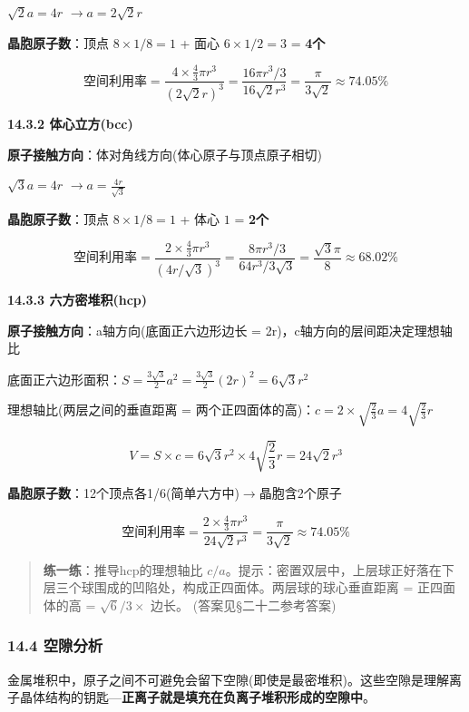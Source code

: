 \documentclass[a4paper,11pt]{ctexart}
\newcommand{\箭}{\ensuremath{\rightarrow}}
\newcommand{\左箭}{\ensuremath{\leftarrow}}
\newcommand{\上箭}{\ensuremath{\uparrow}}
\newcommand{\下箭}{\ensuremath{\downarrow}}
\newcommand{\衡}{\ensuremath{\rightleftharpoons}}
\newcommand{\双箭}{\ensuremath{\leftrightarrow}}
\newcommand{\约等于}{\ensuremath{\approx}}
\newcommand{\小于等于}{\ensuremath{\leq}}
\newcommand{\大于等于}{\ensuremath{\geq}}
\newcommand{\不等于}{\ensuremath{\neq}}
\newcommand{\西格马}{\ensuremath{\sigma}}
\newcommand{\派}{\ensuremath{\pi}}
\begin{document}
\(\sqrt{2}a = 4r\) \箭 \(a = 2\sqrt{2}r\)

\textbf{晶胞原子数}：顶点 \(8 \times 1/8 = 1\) + 面心 \(6 \times 1/2 = 3\) = \textbf{4个}

\[
\text{空间利用率} = \frac{4 \times \frac{4}{3}\pi r^3}{(2\sqrt{2}r)^3} = \frac{16\pi r^3 / 3}{16\sqrt{2}r^3} = \frac{\pi}{3\sqrt{2}} \approx 74.05\%
\]

\textbf{14.3.2 体心立方(bcc)}

\textbf{原子接触方向}：体对角线方向(体心原子与顶点原子相切)

\(\sqrt{3}a = 4r\) \箭 \(a = \frac{4r}{\sqrt{3}}\)

\textbf{晶胞原子数}：顶点 \(8 \times 1/8 = 1\) + 体心 \(1\) = \textbf{2个}

\[
\text{空间利用率} = \frac{2 \times \frac{4}{3}\pi r^3}{(4r/\sqrt{3})^3} = \frac{8\pi r^3 / 3}{64r^3 / 3\sqrt{3}} = \frac{\sqrt{3}\pi}{8} \approx 68.02\%
\]

\textbf{14.3.3 六方密堆积(hcp)}

\textbf{原子接触方向}：a轴方向(底面正六边形边长 = 2r)，c轴方向的层间距决定理想轴比

底面正六边形面积：\(S = \frac{3\sqrt{3}}{2}a^2 = \frac{3\sqrt{3}}{2}(2r)^2 = 6\sqrt{3}r^2\)

理想轴比(两层之间的垂直距离 = 两个正四面体的高)：\(c = 2 \times \sqrt{\frac{2}{3}}a = 4\sqrt{\frac{2}{3}}r\)

\[
V = S \times c = 6\sqrt{3}r^2 \times 4\sqrt{\frac{2}{3}}r = 24\sqrt{2}r^3
\]

\textbf{晶胞原子数}：12个顶点各1/6(简单六方中)\箭 晶胞含2个原子

\[
\text{空间利用率} = \frac{2 \times \frac{4}{3}\pi r^3}{24\sqrt{2}r^3} = \frac{\pi}{3\sqrt{2}} \approx 74.05\%
\]

\begin{quote}
\textbf{练一练}：推导hcp的理想轴比 \(c/a\)。提示：密置双层中，上层球正好落在下层三个球围成的凹陷处，构成正四面体。两层球的球心垂直距离 = 正四面体的高 = \(\sqrt{6}/3 \times\) 边长。
(答案见§二十二参考答案)
\end{quote}

\subsubsection{14.4 空隙分析}\label{ux7a7aux9699ux5206ux6790}

金属堆积中，原子之间不可避免会留下空隙(即使是最密堆积)。这些空隙是理解离子晶体结构的钥匙---\textbf{正离子就是填充在负离子堆积形成的空隙中}。
\end{document}
